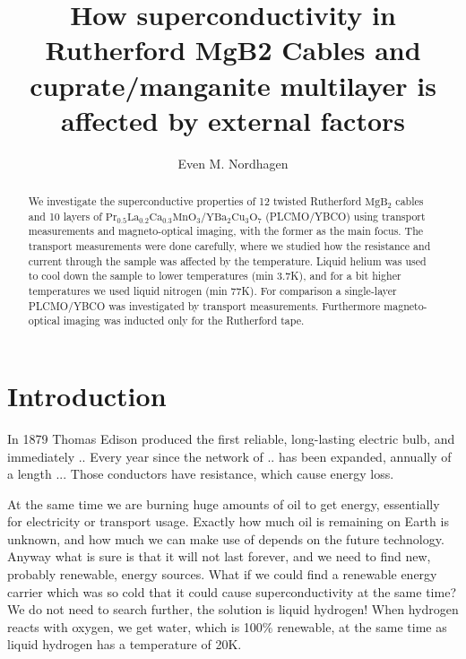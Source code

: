 \documentclass{comjnl}
\newcommand*\chem[1]{\ensuremath{\mathrm{#1}}}
\begin{document}
\title[Granular superconductivity of Rutherford cable and cuprate/manganite multilayer]{How superconductivity in Rutherford MgB2 Cables and cuprate/manganite multilayer is affected by external factors}
\author{Even M. Nordhagen}
 

 




\begin{abstract}
We investigate the superconductive properties of 12 twisted Rutherford \chem{MgB_2} cables and 10 layers of \chem{Pr_{0.5}La_{0.2}Ca_{0.3}MnO_3/YBa_2Cu_3O_7} (PLCMO/YBCO) using transport measurements and magneto-optical imaging, with the former as the main focus. The transport measurements were done carefully, where we studied how the resistance and current through the sample was affected by the temperature. Liquid helium was used to cool down the sample to lower temperatures (min 3.7K), and for a bit higher temperatures we used liquid nitrogen (min 77K). For comparison a single-layer PLCMO/YBCO was investigated by transport measurements. Furthermore magneto-optical imaging was inducted only for the Rutherford tape.
\end{abstract}

\maketitle


\section{Introduction}
In 1879 Thomas Edison produced the first reliable, long-lasting electric bulb, and immediately .. Every year since the network of .. has been expanded, annually of a length ... Those conductors have resistance, which cause energy loss. 

At the same time we are burning huge amounts of oil to get energy, essentially for electricity or transport usage. Exactly how much oil is remaining on Earth is unknown, and how much we can make use of depends on the future technology. Anyway what is sure is that it will not last forever, and we need to find new, probably renewable, energy sources. What if we could find a renewable energy carrier which was so cold that it could cause superconductivity at the same time? We do not need to search further, the solution is liquid hydrogen! When hydrogen reacts with oxygen, we get water, which is 100\% renewable, at the same time as liquid hydrogen has a temperature of 20K. 
\end{document}
